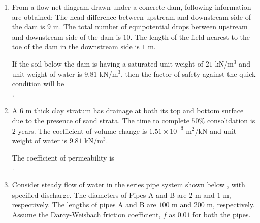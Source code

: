 \documentclass[journal,12pt,onecolumn]{article}
\theoremstyle{remark}
\begin{document}
\begin{enumerate}
    \hfill{}

    \item From a flow-net diagram drawn under a concrete dam, following information are obtained:  The head difference between upstream and downstream side of the dam is $9$ m.  The total number of equipotential drops between upstream and downstream side of the dam is $10$.  The length of the field nearest to the toe of the dam in the downstream side is $1$ m.
    
    If the soil below the dam is having a saturated unit weight of $21$ kN/m$^3$ and unit weight of water is $9.81$ kN/m$^3$, then the factor of safety against the quick condition will be \underline{\hspace{2cm}} \\ .
    
    \hfill{}

    \item A $6$ m thick clay stratum has drainage at both its top and bottom surface due to the presence of sand strata. The time to complete $50$\% consolidation is $2$ years. The coefficient of volume change  is $1.51 \times 10^{-3}$ m$^2$/kN and unit weight of water is $9.81$ kN/m$^3$.
    
    The coefficient of permeability  is \underline{\hspace{2cm}} \\
    .
    
    \hfill{}

    \item Consider steady flow of water in the series pipe system shown below , with specified discharge. The diameters of Pipes A and B are $2$ m and $1$ m, respectively. The lengths of pipes A and B are $100$ m and $200$ m, respectively. Assume the Darcy-Weisbach friction coefficient, $f$ as $0.01$ for both the pipes.
    

\end{enumerate}
\end{document}
